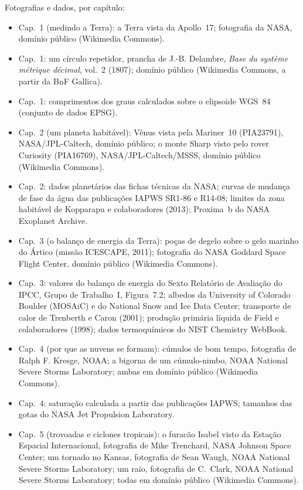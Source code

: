\bigskip
\noindent Fotografias e dados, por capítulo:
\begin{itemize}\small
  \item Cap.~1 (medindo a Terra): a Terra vista da Apollo~17; fotografia da NASA, domínio público (Wikimedia Commons).
  \item Cap.~1: um círculo repetidor, prancha de J.-B. Delambre, \emph{Base du système métrique décimal}, vol.~2 (1807); domínio público (Wikimedia Commons, a partir da BnF Gallica).
  \item Cap.~1: comprimentos dos graus calculados sobre o elipsoide WGS~84 (conjunto de dados EPSG).
  \item Cap.~2 (um planeta habitável): Vênus vista pela Mariner~10 (PIA23791), NASA/JPL-Caltech, domínio público; o monte Sharp visto pelo rover Curiosity (PIA16769), NASA/JPL-Caltech/MSSS, domínio público (Wikimedia Commons).
  \item Cap.~2: dados planetários das fichas técnicas da NASA; curvas de mudança de fase da água das publicações IAPWS SR1-86 e R14-08; limites da zona habitável de Kopparapu e colaboradores (2013); Proxima~b do NASA Exoplanet Archive.
  \item Cap.~3 (o balanço de energia da Terra): poças de degelo sobre o gelo marinho do Ártico (missão ICESCAPE, 2011); fotografia do NASA Goddard Space Flight Center, domínio público (Wikimedia Commons).
  \item Cap.~3: valores do balanço de energia do Sexto Relatório de Avaliação do IPCC, Grupo de Trabalho~I, Figura~7.2; albedos da University of Colorado Boulder (MOSAiC) e do National Snow and Ice Data Center; transporte de calor de Trenberth e Caron (2001); produção primária líquida de Field e colaboradores (1998); dados termoquímicos do NIST Chemistry WebBook.
  \item Cap.~4 (por que as nuvens se formam): cúmulos de bom tempo, fotografia de Ralph F. Kresge, NOAA; a bigorna de um cúmulo-nimbo, NOAA National Severe Storms Laboratory; ambas em domínio público (Wikimedia Commons).
  \item Cap.~4: saturação calculada a partir das publicações IAPWS; tamanhos das gotas do NASA Jet Propulsion Laboratory.
  \item Cap.~5 (trovoadas e ciclones tropicais): o furacão Isabel visto da Estação Espacial Internacional, fotografia de Mike Trenchard, NASA Johnson Space Center; um tornado no Kansas, fotografia de Sean Waugh, NOAA National Severe Storms Laboratory; um raio, fotografia de C.~Clark, NOAA National Severe Storms Laboratory; todas em domínio público (Wikimedia Commons).

\end{itemize}
